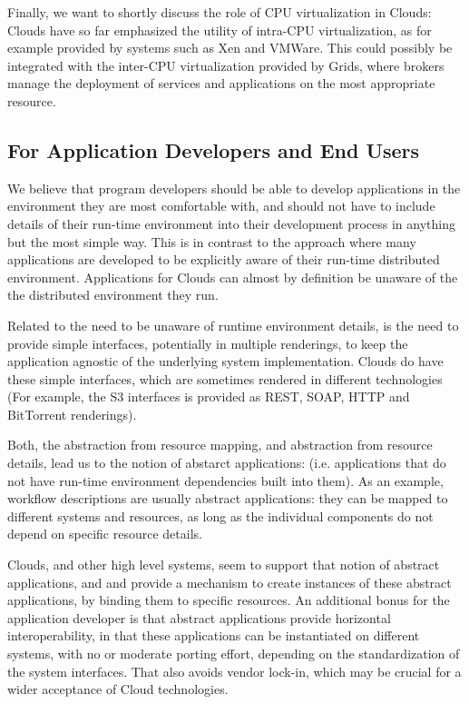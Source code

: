 \documentclass[conference,final]{IEEEtran}
\begin{document}
  Finally, we want to shortly discuss the role of CPU virtualization
  in Clouds: Clouds have so far emphasized the utility of intra-CPU
  virtualization, as for example provided by systems such as Xen and
  VMWare.  This could possibly be integrated with the inter-CPU
  virtualization provided by Grids, where brokers manage the
  deployment of services and applications on the most appropriate
  resource.  

  
 \subsection{For Application Developers and End Users}

  We believe that program developers should be able to develop
  applications in the environment they are most comfortable with, and
  should not have to include details of their run-time environment
  into their development process in anything but the most simple way.
  This is in contrast to the approach where many applications are
  developed to be explicitly aware of their run-time distributed
  environment.  Applications for Clouds can almost by definition be
  unaware of the the distributed environment they run.  

  Related to the need to be unaware of runtime environment details, is
  the need to provide simple interfaces, potentially in multiple
  renderings, to keep the application agnostic of the underlying
  system implementation.  Clouds do have these simple interfaces,
  which are sometimes rendered in different technologies (For example,
  the S3 interfaces is provided as REST, SOAP, HTTP and BitTorrent
  renderings).  

  Both, the abstraction from resource mapping, and abstraction from
  resource details, lead us to the notion of abstarct applications:
  (i.e. applications that do not have run-time environment
  dependencies built into them).  As an example, workflow descriptions
  are usually abstract applications: they can be mapped to different
  systems and resources, as long as the individual components do not
  depend on specific resource details.

  Clouds, and other high level systems, seem to support that notion of
  abstract applications, and and provide a mechanism to create
  instances of these abstract applications, by binding them to
  specific resources.  An additional bonus for the application
  developer is that abstract applications provide horizontal
  interoperability, in that these applications can be instantiated on
  different systems, with no or moderate porting effort, depending on
  the standardization of the system interfaces.  That also avoids
  vendor lock-in, which may be crucial for a wider acceptance of Cloud
  technologies.
\end{document}
